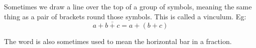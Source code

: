                         Sometimes we draw a line over the top of a group of symbols, meaning the
same thing as a pair of brackets round those symbols. This is called a 
vinculum. Eg:
\[ {a} + \bar{{b + c}} = {a + (b + c)} \]
\par
The word is also sometimes used to mean the horizontal bar in a fraction.			